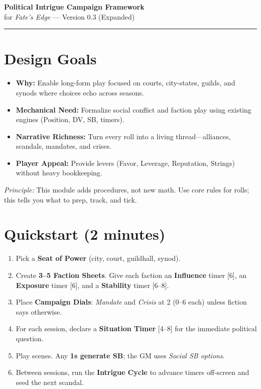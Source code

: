 \documentclass[11pt]{article}
\begin{document}

\begin{center}
{\LARGE \textbf{Political Intrigue Campaign Framework}}\\[3pt]
{\large for \emph{Fate's Edge} --- Version 0.3 (Expanded)}\\[2pt]
\end{center}
\vspace{0.25em}
\hrule\vspace{0.75em}

\section*{Design Goals}
\begin{itemize}
  \item \textbf{Why:} Enable long-form play focused on courts, city-states, guilds, and synods where choices echo across seasons.
  \item \textbf{Mechanical Need:} Formalize social conflict and faction play using existing engines (Position, DV, SB, timers).
  \item \textbf{Narrative Richness:} Turn every roll into a living thread---alliances, scandals, mandates, and crises.
  \item \textbf{Player Appeal:} Provide levers (Favor, Leverage, Reputation, Strings) without heavy bookkeeping.
\end{itemize}
\emph{Principle:} This module adds procedures, not new math. Use core rules for rolls; this tells you what to prep, track, and tick.

\section*{Quickstart (2 minutes)}
\begin{enumerate}
  \item Pick a \textbf{Seat of Power} (city, court, guildhall, synod).
  \item Create \textbf{3--5 Faction Sheets}. Give each faction an \textbf{Influence} timer [6], an \textbf{Exposure} timer [6], and a \textbf{Stability} timer [6--8].
  \item Place \textbf{Campaign Dials}: \emph{Mandate} and \emph{Crisis} at 2 (0--6 each) unless fiction says otherwise.
  \item For each session, declare a \textbf{Situation Timer } [4--8] for the immediate political question.
  \item Play scenes. Any \textbf{1s generate SB}; the GM uses \emph{Social SB options}.
  \item Between sessions, run the \textbf{Intrigue Cycle} to advance timers off-screen and seed the next scandal.
\end{enumerate}
\end{document}
